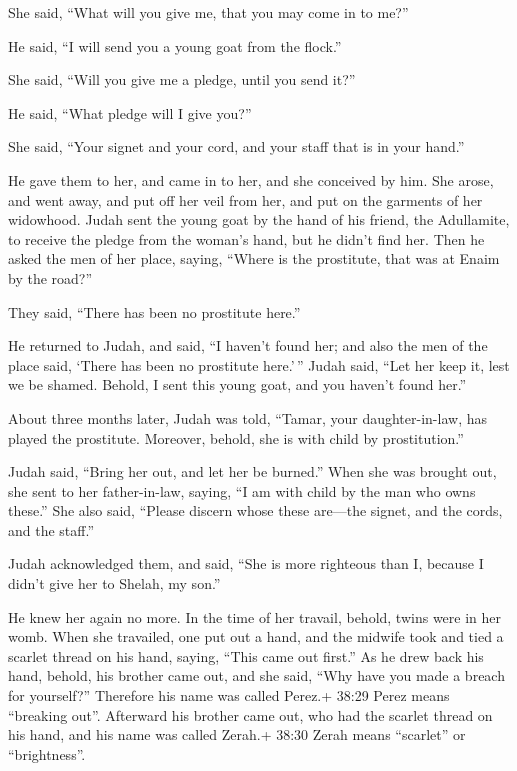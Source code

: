 She said, ``What will you give me, that you may come in to me?''

 He said, ``I will send you a young goat from the flock.''

She said, ``Will you give me a pledge, until you send it?''

 He said, ``What pledge will I give you?''

She said, ``Your signet and your cord, and your staff that is in your
hand.''

He gave them to her, and came in to her, and she conceived by him.
 She arose, and went away, and put off her veil from her,
and put on the garments of her widowhood.  Judah sent the
young goat by the hand of his friend, the Adullamite, to receive the
pledge from the woman's hand, but he didn't find her.  Then
he asked the men of her place, saying, ``Where is the prostitute, that
was at Enaim by the road?''

They said, ``There has been no prostitute here.''

 He returned to Judah, and said, ``I haven't found her; and
also the men of the place said, `There has been no prostitute here.'\,''
 Judah said, ``Let her keep it, lest we be shamed. Behold,
I sent this young goat, and you haven't found her.''

 About three months later, Judah was told, ``Tamar, your
daughter-in-law, has played the prostitute. Moreover, behold, she is
with child by prostitution.''

Judah said, ``Bring her out, and let her be burned.''  When
she was brought out, she sent to her father-in-law, saying, ``I am with
child by the man who owns these.'' She also said, ``Please discern whose
these are---the signet, and the cords, and the staff.''

 Judah acknowledged them, and said, ``She is more righteous
than I, because I didn't give her to Shelah, my son.''

He knew her again no more.  In the time of her travail,
behold, twins were in her womb.  When she travailed, one
put out a hand, and the midwife took and tied a scarlet thread on his
hand, saying, ``This came out first.''  As he drew back his
hand, behold, his brother came out, and she said, ``Why have you made a
breach for yourself?'' Therefore his name was called Perez.+ 38:29 Perez
means ``breaking out''.  Afterward his brother came out,
who had the scarlet thread on his hand, and his name was called Zerah.+
38:30 Zerah means ``scarlet'' or ``brightness''.

